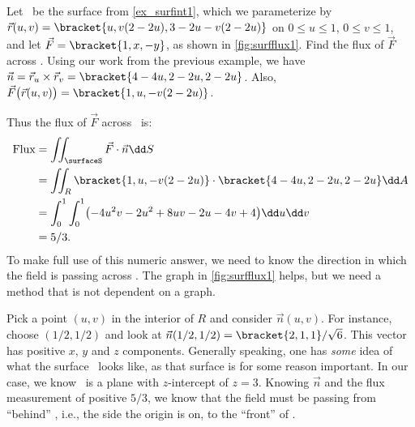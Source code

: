 \begin{example}\label{ex_surfflux1}%
Let \surfaceS\ be the surface from \autoref{ex_surfint1}, which we parameterize by $\vec r(u,v) =\bracket{u, v(2-2u),3-2u-v(2-2u)}$ on $0\leq u\leq 1$, $0\leq v\leq 1$, and let $\vec F =\bracket{1, x,-y}$, as shown in \autoref{fig:surfflux1}. Find the flux of $\vec F$ across \surfaceS.
\solution
Using our work from the previous example, we have $\vec n = \vec r_u\times\vec r_v =\bracket{4-4u,2-2u,2-2u}$. Also, $\vec F\bigl(\vec r(u,v)\bigr) =\bracket{1, u, -v(2-2u)}$. 

Thus the flux of $\vec F$ across \surfaceS\ is:
\begin{align*}
	\text{Flux}
	&= \iint_{\surfaceS} \vec F\cdot \vec n\dd S\\
	&= \iint_R\bracket{1,u,-v(2-2u)}\cdot\bracket{4-4u,2-2u,2-2u}\dd A \\
	&= \int_0^1\int_0^1 \bigl(-4u^2v-2u^2+8uv-2u-4v+4\bigr)\dd u\dd v\\
	&= 5/3.
\end{align*}
To make full use of this numeric answer, we need to know the direction in which the field is passing across \surfaceS. The graph in \autoref{fig:surfflux1} helps, but we need a method that is not dependent on a graph.

Pick a point $(u,v)$ in the interior of $R$ and consider $\vec n(u,v)$. For instance, choose $(1/2,1/2)$ and look at $\vec n(1/2,1/2) =\bracket{2,1,1}/\sqrt{6}$. This vector has positive $x$, $y$ and $z$ components. Generally speaking, one has \emph{some} idea of what the surface \surfaceS\ looks like, as that surface is for some reason important. In our case, we know \surfaceS\ is a plane with $z$-intercept of $z=3$. Knowing $\vec n$ and the flux measurement of positive $5/3$, we know that the field must be passing from ``behind'' \surfaceS, i.e., the side the origin is on, to the ``front'' of \surfaceS.
\end{example}


